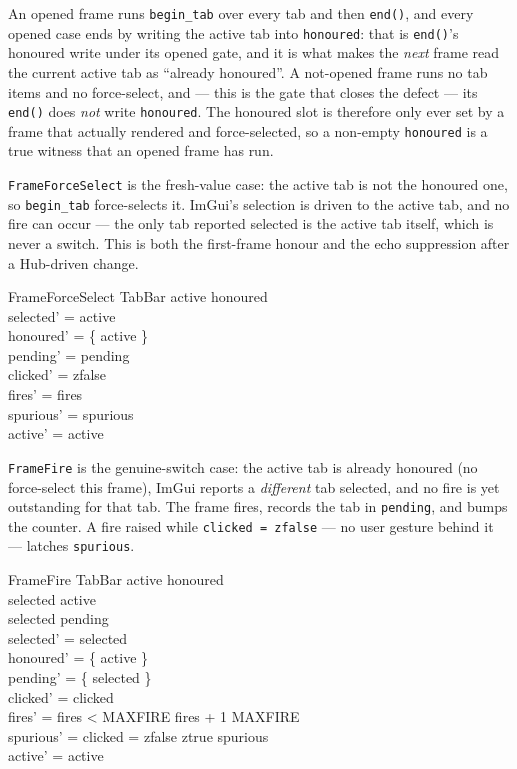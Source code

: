 \documentclass[a4paper,10pt,fleqn]{article}
\begin{document}
An opened frame runs \texttt{begin\_tab} over every tab and then \texttt{end()},
and every opened case ends by writing the active tab into \texttt{honoured}:
that is \texttt{end()}'s honoured write under its opened gate, and it is what
makes the \emph{next} frame read the current active tab as ``already
honoured''.  A not-opened frame runs no tab items and no force-select, and ---
this is the gate that closes the defect --- its \texttt{end()} does \emph{not}
write \texttt{honoured}.  The honoured slot is therefore only ever set by a
frame that actually rendered and force-selected, so a non-empty
\texttt{honoured} is a true witness that an opened frame has run.

\texttt{FrameForceSelect} is the fresh-value case: the active tab is not the
honoured one, so \texttt{begin\_tab} force-selects it.  ImGui's selection is
driven to the active tab, and no fire can occur --- the only tab reported
selected is the active tab itself, which is never a switch.  This is both the
first-frame honour and the echo suppression after a Hub-driven change.

\begin{schema}{FrameForceSelect}
  \Delta TabBar
\where
  active \notin honoured \\
  selected' = active \\
  honoured' = \{ active \} \\
  pending' = pending \\
  clicked' = zfalse \\
  fires' = fires \\
  spurious' = spurious \\
  active' = active
\end{schema}

\texttt{FrameFire} is the genuine-switch case: the active tab is already
honoured (no force-select this frame), ImGui reports a \emph{different} tab
selected, and no fire is yet outstanding for that tab.  The frame fires,
records the tab in \texttt{pending}, and bumps the counter.  A fire raised
while \texttt{clicked = zfalse} --- no user gesture behind it --- latches
\texttt{spurious}.

\begin{schema}{FrameFire}
  \Delta TabBar
\where
  active \in honoured \\
  selected \neq active \\
  selected \notin pending \\
  selected' = selected \\
  honoured' = \{ active \} \\
  pending' = \{ selected \} \\
  clicked' = clicked \\
  fires' = \IF fires < MAXFIRE \THEN fires + 1 \ELSE MAXFIRE \\
  spurious' = \IF clicked = zfalse \THEN ztrue \ELSE spurious \\
  active' = active
\end{schema}
\end{document}
